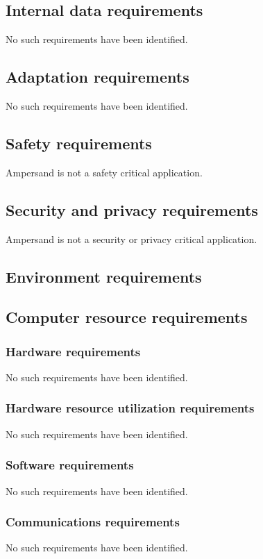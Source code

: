 \subsection{Internal data requirements}
No such requirements have been identified.

\subsection{Adaptation requirements}
No such requirements have been identified.

\subsection{Safety requirements}
Ampersand is not a safety critical application.

\subsection{Security and privacy requirements}
Ampersand is not a security or privacy critical application.

\subsection{Environment requirements}

\subsection{Computer resource requirements}
	\subsubsection{Hardware requirements}
	No such requirements have been identified.

	\subsubsection{Hardware resource utilization requirements}
	No such requirements have been identified.

	\subsubsection{Software requirements}
	No such requirements have been identified.

	\subsubsection{Communications requirements}
	No such requirements have been identified.

